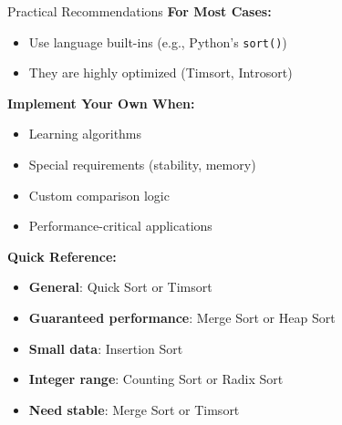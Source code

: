 \documentclass[aspectratio=169]{beamer}
\begin{document}
\begin{frame}{Practical Recommendations}
  \textbf{For Most Cases:}
  \begin{itemize}
    \item Use language built-ins (e.g., Python's \texttt{sort()})
    \item They are highly optimized (Timsort, Introsort)
  \end{itemize}

  \vspace{0.3cm}
  \textbf{Implement Your Own When:}
  \begin{itemize}
    \item Learning algorithms
    \item Special requirements (stability, memory)
    \item Custom comparison logic
    \item Performance-critical applications
  \end{itemize}

  \vspace{0.3cm}
  \textbf{Quick Reference:}
  \begin{itemize}
    \item \textbf{General}: Quick Sort or Timsort
    \item \textbf{Guaranteed performance}: Merge Sort or Heap Sort
    \item \textbf{Small data}: Insertion Sort
    \item \textbf{Integer range}: Counting Sort or Radix Sort
    \item \textbf{Need stable}: Merge Sort or Timsort
  \end{itemize}
\end{frame}
\end{document}
